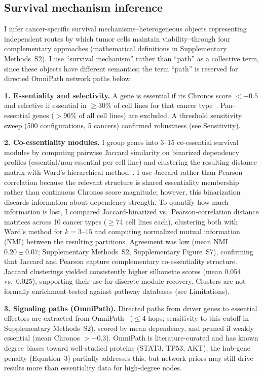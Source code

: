 \documentclass[11pt]{article}
\begin{document}
\subsection*{Survival mechanism inference}
I infer cancer-specific survival mechanisms--heterogeneous objects representing independent routes by which tumor cells maintain viability--through four complementary approaches (mathematical definitions in Supplementary Methods~S2). I use ``survival mechanism'' rather than ``path'' as a collective term, since these objects have different semantics; the term ``path'' is reserved for directed OmniPath network paths below.

\textbf{1. Essentiality and selectivity.} A gene is essential if its Chronos score $< -0.5$ and selective if essential in $\geq$30\% of cell lines for that cancer type~\cite{Dempster2021,Behan2019}. Pan-essential genes ($>$90\% of all cell lines) are excluded. A threshold sensitivity sweep (500 configurations, 5 cancers) confirmed robustness (see Sensitivity).

\textbf{2. Co-essentiality modules.} I group genes into 3--15 co-essential survival modules by computing pairwise Jaccard similarity on binarized dependency profiles (essential/non-essential per cell line) and clustering the resulting distance matrix with Ward's hierarchical method~\cite{Pan2018}. I use Jaccard rather than Pearson correlation because the relevant structure is shared essentiality membership rather than continuous Chronos score magnitude; however, this binarization discards information about dependency strength. To quantify how much information is lost, I compared Jaccard-binarized vs.\ Pearson-correlation distance matrices across 10 cancer types ($\geq$74 cell lines each), clustering both with Ward's method for $k = 3$--$15$ and computing normalized mutual information (NMI) between the resulting partitions. Agreement was low (mean NMI = $0.20 \pm 0.07$; Supplementary Methods~S2, Supplementary Figure~S7), confirming that Jaccard and Pearson capture complementary co-essentiality structure. Jaccard clusterings yielded consistently higher silhouette scores (mean 0.054 vs.\ 0.025), supporting their use for discrete module recovery. Clusters are not formally enrichment-tested against pathway databases (see Limitations).

\textbf{3. Signaling paths (OmniPath).} Directed paths from driver genes to essential effectors are extracted from OmniPath~\cite{Turei2026} ($\leq$4 hops; sensitivity to this cutoff in Supplementary Methods~S2), scored by mean dependency, and pruned if weakly essential (mean Chronos $> -0.3$). OmniPath is literature-curated and has known degree biases toward well-studied proteins (STAT3, TP53, AKT); the hub-gene penalty (Equation~3) partially addresses this, but network priors may still drive results more than essentiality data for high-degree nodes.
\end{document}
